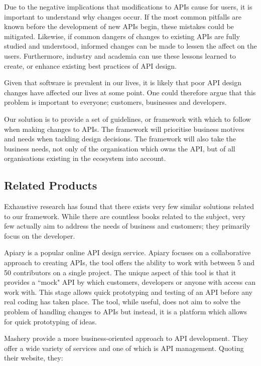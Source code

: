 \documentclass{article}
\begin{document}
Due to the negative implications that modifications to APIs cause for users, it is important to understand why changes occur. If the most common pitfalls are known before the development of new APIs begin, these mistakes could be mitigated. Likewise, if common dangers of changes to existing APIs are fully studied and understood, informed changes can be made to lessen the affect on the users. Furthermore, industry and academia can use these lessons learned to create, or enhance existing best practices of API design.\smallskip

Given that software is prevalent in our lives, it is likely that poor API design changes have affected our lives at some point. One could therefore argue that this problem is important to everyone; customers, businesses and developers. \smallskip

Our solution is to provide a set of guidelines, or framework with which to follow when making changes to APIs. The framework will prioritise business motives and needs when tackling design decisions. The framework will also take the business needs, not only of the organisation which owns the API, but of all organisations existing in the ecosystem into account. 

\subsection{Related Products}
Exhaustive research has found that there exists very few similar solutions related to our framework. While there are countless books related to the subject, very few actually aim to address the needs of business and customers; they primarily focus on the developer. \smallskip

Apiary \cite{Apiary} is a popular online API design service. Apiary focuses on a collaborative approach to creating APIs, the tool offers the ability to work with between 5 and 50 contributors on a single project. The unique aspect of this tool is that it provides a ``mock" API by which customers, developers or anyone with access can work with. This stage allows quick prototyping and testing of an API before any real coding has taken place. The tool, while useful, does not aim to solve the problem of handling changes to APIs but instead, it is a platform which allows for quick prototyping of ideas.

Mashery \cite{Mashery} provide a more business-oriented approach to API development. They offer a wide variety of services and one of which is API management. Quoting their website, they:
\end{document}
